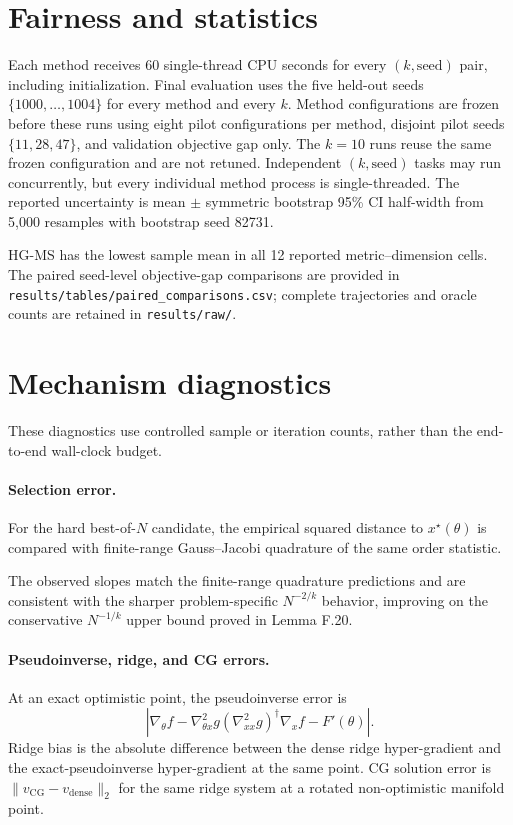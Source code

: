 \documentclass[10pt]{article}
\begin{document}
\section{Fairness and statistics}

Each method receives 60 single-thread CPU seconds for every
$(k,\mathrm{seed})$ pair, including initialization.  Final evaluation uses the
five held-out seeds $\{1000,\ldots,1004\}$ for every method and every $k$.
Method configurations are frozen before these runs using eight pilot
configurations per method, disjoint pilot seeds $\{11,28,47\}$, and validation
objective gap only.  The $k=10$ runs reuse the same frozen configuration and
are not retuned.  Independent $(k,\mathrm{seed})$ tasks may run concurrently,
but every individual method process is single-threaded.  The reported
uncertainty is mean $\pm$ symmetric bootstrap 95\% CI half-width from 5,000
resamples with bootstrap seed 82731.



HG-MS has the lowest sample mean in all 12 reported metric--dimension cells.
The paired seed-level objective-gap comparisons are provided in
\texttt{results/tables/paired\_comparisons.csv}; complete trajectories and
oracle counts are retained in \texttt{results/raw/}.

\section{Mechanism diagnostics}

These diagnostics use controlled sample or iteration counts, rather than the
end-to-end wall-clock budget.

\paragraph{Selection error.}
For the hard best-of-$N$ candidate, the empirical squared distance to
$x^\star(\theta)$ is compared with finite-range Gauss--Jacobi quadrature of
the same order statistic.



The observed slopes match the finite-range quadrature predictions and are
consistent with the sharper problem-specific $N^{-2/k}$ behavior, improving
on the conservative $N^{-1/k}$ upper bound proved in Lemma F.20.

\paragraph{Pseudoinverse, ridge, and CG errors.}
At an exact optimistic point, the pseudoinverse error is
\[
\left|
\nabla_\theta f-\nabla_{\theta x}^2g
(\nabla_{xx}^2g)^\dagger\nabla_xf-F'(\theta)
\right|.
\]
Ridge bias is the absolute difference between the dense ridge hyper-gradient
and the exact-pseudoinverse hyper-gradient at the same point.  CG solution
error is $\lVert v_{\mathrm{CG}}-v_{\mathrm{dense}}\rVert_2$ for the same
ridge system at a rotated non-optimistic manifold point.
\end{document}
